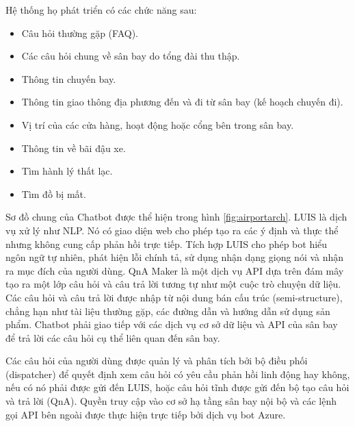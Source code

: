 Hệ thống họ phát triển có các chức năng sau:

\begin{itemize}
    \item Câu hỏi thường gặp (FAQ).
    \item Các câu hỏi chung về sân bay do tổng đài thu thập.
    \item Thông tin chuyến bay.
    \item Thông tin giao thông địa phương đến và đi từ sân bay (kế hoạch chuyến đi).
    \item Vị trí của các cửa hàng, hoạt động hoặc cổng bên trong sân bay.
    \item Thông tin về bãi đậu xe.
    \item Tìm hành lý thất lạc.
    \item Tìm đồ bị mất.
\end{itemize}

Sơ đồ chung của Chatbot được thể hiện trong hình \ref{fig:airportarch}. LUIS là dịch vụ xử lý như NLP. Nó có giao diện web cho phép tạo ra các ý định và thực thể nhưng không cung cấp phản hồi trực tiếp. Tích hợp LUIS cho phép bot hiểu ngôn ngữ tự nhiên, phát hiện lỗi chính tả, sử dụng nhận dạng giọng nói và nhận ra mục đích của người dùng. QnA Maker là một dịch vụ API dựa trên đám mây tạo ra một lớp câu hỏi và câu trả lời tương tự như một cuộc trò chuyện dữ liệu. Các câu hỏi và câu trả lời được nhập từ nội dung bán cấu trúc (semi-structure), chẳng hạn như tài liệu thường gặp, các đường dẫn và hướng dẫn sử dụng sản phẩm. Chatbot phải giao tiếp với các dịch vụ cơ sở dữ liệu và API của sân bay để trả lời các câu hỏi cụ thể liên quan đến sân bay.

Các câu hỏi của người dùng được quản lý và phân tích bởi bộ điều phối (dispatcher) để quyết định xem câu hỏi có yêu cầu phản hồi linh động hay không, nếu có nó phải được gửi đến LUIS, hoặc câu hỏi tĩnh được gửi đến bộ tạo câu hỏi và trả lời (QnA). Quyền truy cập vào cơ sở hạ tầng sân bay nội bộ và các lệnh gọi API bên ngoài được thực hiện trực tiếp bởi dịch vụ bot Azure.

